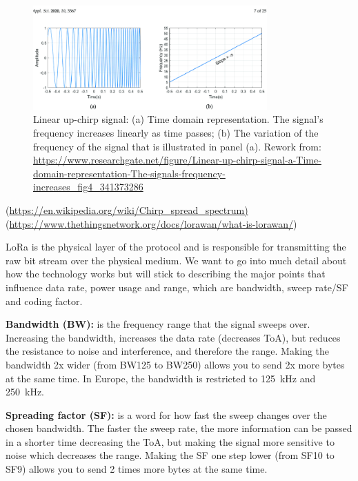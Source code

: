 \begin{figure}[H]
    \centering
    \includegraphics[width=0.8\textwidth]{figures/linear-chirp-up-signal.png}
    \caption{Linear up-chirp signal: (a) Time domain representation. The signal's frequency increases linearly as time passes; (b) The variation of the frequency of the signal that is illustrated in panel (a). Rework from: \url{https://www.researchgate.net/figure/Linear-up-chirp-signal-a-Time-domain-representation-The-signals-frequency-increases_fig4_341373286}}
    \label{fig:LoRa-upchirp}
\end{figure}

(\url{https://en.wikipedia.org/wiki/Chirp_spread_spectrum)}
(\url{https://www.thethingsnetwork.org/docs/lorawan/what-is-lorawan/})

LoRa is the physical layer of the protocol and is responsible for transmitting the raw bit stream over the physical medium.
We want to go into much detail about how the technology works but will stick to describing the major points that influence data rate, power usage and range, which are bandwidth, sweep rate/\ac{SF} and coding factor.

\textbf{Bandwidth (BW):} is the frequency range that the signal sweeps over. Increasing the bandwidth, increases the data rate (decreases \ac{ToA}), but reduces the resistance to noise and interference, and therefore the range. Making the bandwidth 2x wider (from BW125 to BW250) allows you to send 2x more bytes at the same time.
In Europe, the bandwidth is restricted to \SI{125}{\kilo\hertz} and \SI{250}{\kilo\hertz}.

\textbf{Spreading factor (SF):} is a word for how fast the sweep changes over the chosen bandwidth. The faster the sweep rate, the more information can be passed in a shorter time decreasing the \ac{ToA}, but making the signal more sensitive to noise which decreases the range. Making the \ac{SF} one step lower (from SF10 to SF9) allows you to send 2 times more bytes at the same time.

